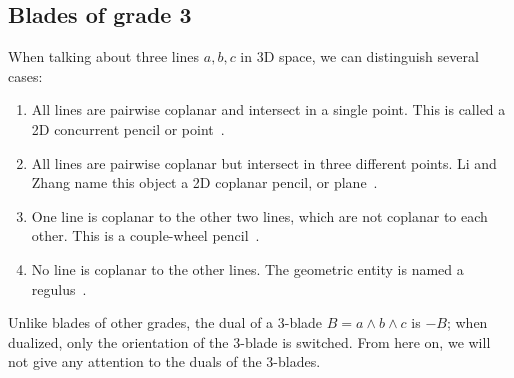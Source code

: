 \subsection{Blades of grade 3}
%
When talking about three lines $a, b, c$ in 3D space, we can distinguish several cases:

\begin{enumerate}[{Case} 1.]
  \item All lines are pairwise coplanar and intersect in a single point.  This is called a 2D concurrent pencil or point~\cite{Hongbo}.
  \item All lines are pairwise coplanar but intersect in three different points.  Li and Zhang name this object a 2D coplanar pencil, or plane~\cite{Hongbo}.
  \item One line is coplanar to the other two lines, which are not coplanar to each other.  This is a couple-wheel pencil~\cite{Hongbo}.
  \item No line is coplanar to the other lines.  The geometric entity is named a regulus~\cite[Section 3.3]{Pottmann}.
\end{enumerate}

Unlike blades of other grades, the dual of a 3-blade $B = a \wedge b \wedge c$ is $-B$; when dualized, only the orientation of the 3-blade is switched.  From here on, we will not give any attention to the duals of the 3-blades.

